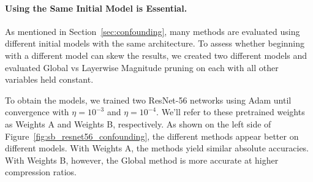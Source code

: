 \vspace{-4mm}
\paragraph{Using the Same Initial Model is Essential.}

As mentioned in Section~\ref{sec:confounding}, many methods are evaluated using different initial models with the same architecture. To assess whether beginning with a different model can skew the results, we created two different models and evaluated Global vs Layerwise Magnitude pruning on each with all other variables held constant.

To obtain the models, we trained two ResNet-56 networks using Adam until convergence with $\eta=10^{-3}$ and $\eta=10^{-4}$.
We'll refer to these pretrained weights as Weights A and Weights B, respectively.
%
As shown on the left side of Figure~\ref{fig:sb_resnet56_confounding}, the different methods appear better on different models. With Weights A, the methods yield similar absolute accuracies. With Weights B, however, the Global method is more accurate at higher compression ratios.

%
%
%

